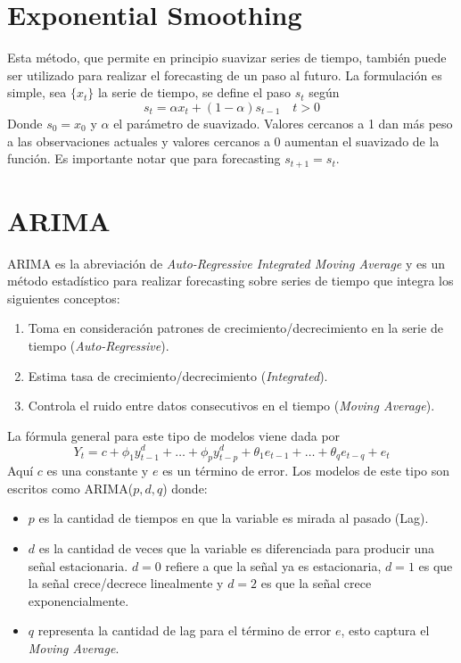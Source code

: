 \section{Exponential Smoothing}

Esta método, que permite en principio suavizar series de tiempo, también puede ser utilizado para realizar el forecasting de un paso al futuro. La formulación es simple, sea $\{x_t\}$ la serie de tiempo, se define el paso $s_t$ según 
$$ 
s_t = \alpha x_t + (1 - \alpha) s_{t-1} \quad t > 0 
$$
Donde $s_0 = x_0$ y $\alpha$ el parámetro de suavizado. Valores cercanos a 1 dan más peso a las observaciones actuales y valores cercanos a 0 aumentan el suavizado de la función. Es importante notar que para forecasting $s_{t+1} = s_{t}$. 



\section{ARIMA}

ARIMA es la abreviación de \textit{Auto-Regressive Integrated Moving Average} y es un método estadístico para realizar forecasting sobre series de tiempo que integra los siguientes conceptos:

\begin{enumerate}
    \item Toma en consideración patrones de crecimiento/decrecimiento en la serie de tiempo (\textit{Auto-Regressive}). 
    \item Estima tasa de crecimiento/decrecimiento (\textit{Integrated}).
    \item Controla el ruido entre datos consecutivos en el tiempo (\textit{Moving Average}).
\end{enumerate}

La fórmula general para este tipo de modelos viene dada por 
$$
Y_t = c + \phi_1y^d_{t-1} + \dots + \phi_py^d_{t-p} + \theta_1e_{t-1} + \dots + \theta_q e_{t-q} + e_t
$$
Aquí $c$ es una constante y $e$ es un término de error. Los modelos de este tipo son escritos como ARIMA($p,d,q$) donde: 

\begin{itemize}
    \item $p$ es la cantidad de tiempos en que la variable es mirada al pasado (Lag).
    \item $d$ es la cantidad de veces que la variable es diferenciada para producir una señal estacionaria. $d=0$ refiere a que la señal ya es estacionaria, $d=1$ es que la señal crece/decrece linealmente y $d=2$ es que la señal crece exponencialmente. 
    \item $q$ representa la cantidad de lag para el término de error $e$, esto captura el \textit{Moving Average}.
\end{itemize}

